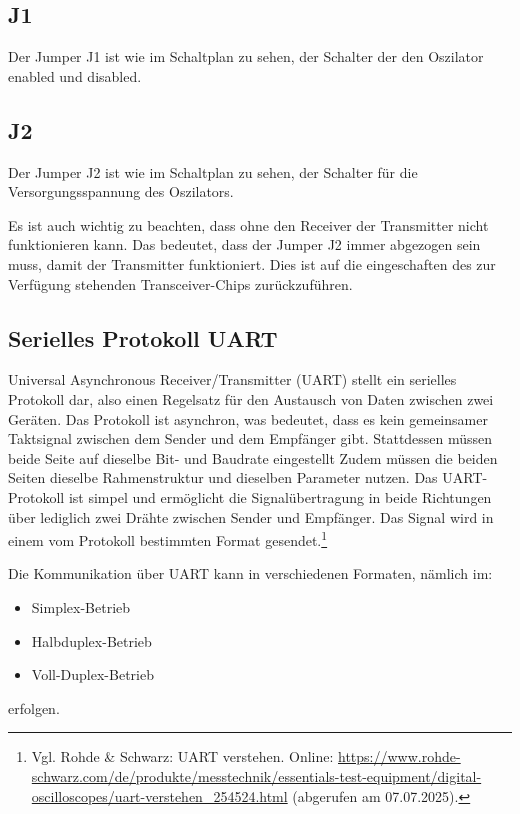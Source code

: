 \subsection{J1}
Der Jumper J1 ist wie im Schaltplan zu sehen, der Schalter der den Oszilator enabled und disabled.
\subsection{J2}
Der Jumper J2 ist wie im Schaltplan zu sehen, der Schalter für die Versorgungsspannung des Oszilators.

Es ist auch wichtig zu beachten, dass ohne den Receiver der Transmitter nicht funktionieren kann. Das bedeutet, dass der Jumper J2 immer abgezogen sein muss, damit der Transmitter funktioniert. Dies ist auf die eingeschaften des zur Verfügung stehenden Transceiver-Chips zurückzuführen.

\subsection{Serielles Protokoll UART}
Universal Asynchronous Receiver/Transmitter (UART) stellt ein serielles Protokoll dar, also einen Regelsatz für den Austausch von Daten zwischen zwei Geräten. Das Protokoll ist asynchron, was bedeutet, dass es kein gemeinsamer Taktsignal zwischen dem Sender und dem Empfänger gibt. Stattdessen müssen beide Seite auf dieselbe Bit- und Baudrate eingestellt
Zudem müssen die beiden Seiten dieselbe Rahmenstruktur und dieselben Parameter nutzen. Das UART-Protokoll ist simpel und ermöglicht die Signalübertragung in beide Richtungen über lediglich zwei Drähte zwischen Sender und Empfänger. Das Signal wird in einem vom Protokoll bestimmten Format gesendet.\footnote{Vgl. Rohde \& Schwarz: UART verstehen. Online: \url{https://www.rohde-schwarz.com/de/produkte/messtechnik/essentials-test-equipment/digital-oscilloscopes/uart-verstehen_254524.html} (abgerufen am 07.07.2025).} 

Die Kommunikation über UART kann in verschiedenen Formaten, nämlich im:
\begin{itemize}
    \item Simplex-Betrieb
    \item Halbduplex-Betrieb
    \item Voll-Duplex-Betrieb
\end{itemize}
erfolgen.

